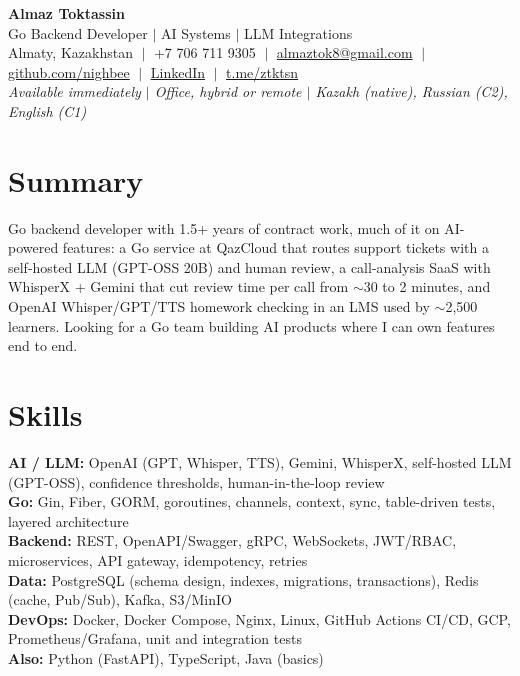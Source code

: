 \documentclass[10pt,a4paper]{article}
\begin{document}
\begin{center}
  {\LARGE \textbf{Almaz Toktassin}}\\[2pt]
  Go Backend Developer $|$ AI Systems $|$ LLM Integrations\\[3pt]
  Almaty, Kazakhstan $\;|\;$ +7 706 711 9305 $\;|\;$
  \href{mailto:almaztok8@gmail.com}{almaztok8@gmail.com} $\;|\;$
  \href{https://github.com/nighbee}{github.com/nighbee} $\;|\;$
  \href{https://www.linkedin.com/in/almaz-toktassin-5405922a9/}{LinkedIn} $\;|\;$
  \href{https://t.me/ztktsn}{t.me/ztktsn}\\
  \textit{Available immediately $|$ Office, hybrid or remote $|$ Kazakh (native), Russian (C2), English (C1)}
\end{center}

\section{Summary}
Go backend developer with 1.5+ years of contract work, much of it on AI-powered features: a Go service at QazCloud that routes support tickets with a self-hosted LLM (GPT-OSS 20B) and human review, a call-analysis SaaS with WhisperX + Gemini that cut review time per call from $\sim$30 to 2 minutes, and OpenAI Whisper/GPT/TTS homework checking in an LMS used by $\sim$2,500 learners. Looking for a Go team building AI products where I can own features end to end.

\section{Skills}
\textbf{AI / LLM:} OpenAI (GPT, Whisper, TTS), Gemini, WhisperX, self-hosted LLM (GPT-OSS), confidence thresholds, human-in-the-loop review\\
\textbf{Go:} Gin, Fiber, GORM, goroutines, channels, context, sync, table-driven tests, layered architecture\\
\textbf{Backend:} REST, OpenAPI/Swagger, gRPC, WebSockets, JWT/RBAC, microservices, API gateway, idempotency, retries\\
\textbf{Data:} PostgreSQL (schema design, indexes, migrations, transactions), Redis (cache, Pub/Sub), Kafka, S3/MinIO\\
\textbf{DevOps:} Docker, Docker Compose, Nginx, Linux, GitHub Actions CI/CD, GCP, Prometheus/Grafana, unit and integration tests\\
\textbf{Also:} Python (FastAPI), TypeScript, Java (basics)
\end{document}
